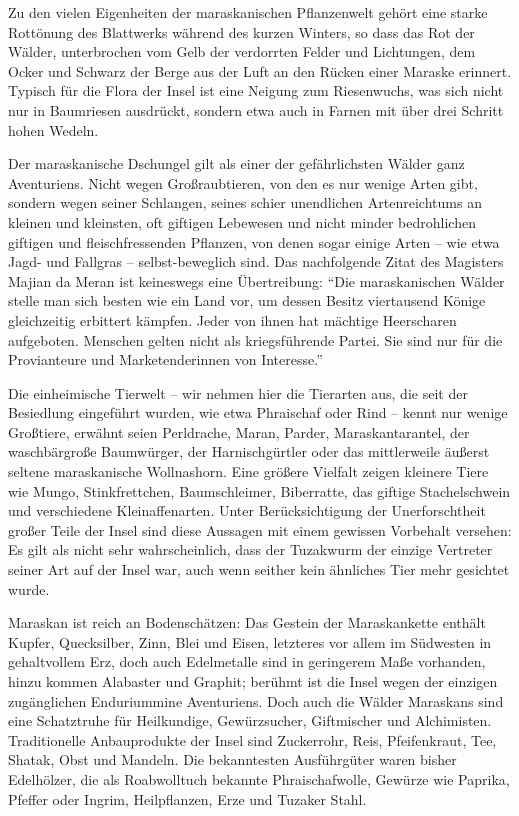Zu den vielen Eigenheiten der maraskanischen Pflanzenwelt gehört eine starke Rottönung des Blattwerks während des kurzen Winters, so dass das Rot der Wälder, unterbrochen vom Gelb der verdorrten Felder und Lichtungen, dem Ocker und Schwarz der Berge aus der Luft an den Rücken einer Maraske erinnert. Typisch für die Flora der Insel ist eine Neigung zum Riesenwuchs, was sich nicht nur in Baumriesen ausdrückt, sondern etwa auch in Farnen mit über drei Schritt hohen Wedeln.

Der maraskanische Dschungel gilt als einer der gefährlichsten Wälder ganz Aventuriens. Nicht wegen Großraubtieren, von den es nur wenige Arten gibt, sondern wegen seiner Schlangen, seines schier unendlichen Artenreichtums an kleinen und kleinsten, oft giftigen Lebewesen und nicht minder bedrohlichen giftigen und fleischfressenden Pflanzen, von denen sogar einige Arten -- wie etwa Jagd- und Fallgras -- selbst-beweglich sind. Das nachfolgende Zitat des Magisters Majian da Meran ist keineswegs eine Übertreibung: ``Die maraskanischen Wälder stelle man sich besten wie ein Land vor, um dessen Besitz viertausend Könige gleichzeitig erbittert kämpfen. Jeder von ihnen hat mächtige Heerscharen aufgeboten. Menschen gelten nicht als kriegsführende Partei. Sie sind nur für die Provianteure und Marketenderinnen von Interesse.''

Die einheimische Tierwelt -- wir nehmen hier die Tierarten aus, die seit der Besiedlung eingeführt wurden, wie etwa Phraischaf oder Rind -- kennt nur wenige Großtiere, erwähnt seien Perldrache, Maran, Parder, Maraskantarantel, der waschbärgroße Baumwürger, der Harnischgürtler oder das mittlerweile äußerst seltene maraskanische Wollnashorn. Eine größere Vielfalt zeigen kleinere Tiere wie Mungo, Stinkfrettchen, Baumschleimer, Biberratte, das giftige Stachelschwein und verschiedene Kleinaffenarten. Unter Berücksichtigung der Unerforschtheit großer Teile der Insel sind diese Aussagen mit einem gewissen Vorbehalt versehen: Es gilt als nicht sehr wahrscheinlich, dass der Tuzakwurm der einzige Vertreter seiner Art auf der Insel war, auch wenn seither kein ähnliches Tier mehr gesichtet wurde.

Maraskan ist reich an Bodenschätzen: Das Gestein der Maraskankette enthält Kupfer, Quecksilber, Zinn, Blei und Eisen, letzteres vor allem im Südwesten in gehaltvollem Erz, doch auch Edelmetalle sind in geringerem Maße vorhanden, hinzu kommen Alabaster und Graphit; berühmt ist die Insel wegen der einzigen zugänglichen Enduriummine Aventuriens. Doch auch die Wälder Maraskans sind eine Schatztruhe für Heilkundige, Gewürzsucher, Giftmischer und Alchimisten. Traditionelle Anbauprodukte der Insel sind Zuckerrohr, Reis, Pfeifenkraut, Tee, Shatak, Obst und Mandeln. Die bekanntesten Ausführgüter waren bisher Edelhölzer, die als Roabwolltuch bekannte Phraischafwolle, Gewürze wie Paprika, Pfeffer oder Ingrim, Heilpflanzen, Erze und Tuzaker Stahl.


